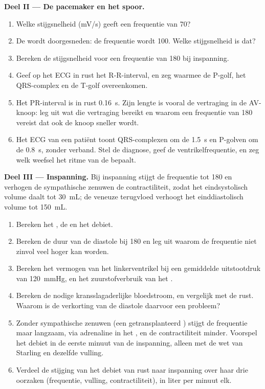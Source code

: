 \begin{problem}
\medskip
\noindent\textbf{Deel II --- De pacemaker en het spoor.}
\begin{enumerate}[resume]
  \item Welke stijgsnelheid (\unit{mV/s}) geeft een frequentie van 70?
  \item De  wordt doorgesneden: de frequentie wordt 100. Welke
        stijgsnelheid is dat?
  \item Bereken de stijgsnelheid voor een frequentie van 180 bij
        inspanning.
  \item Geef op het ECG in rust het R-R-interval, en zeg waarmee de P-golf,
        het QRS-complex en de T-golf overeenkomen.
  \item Het PR-interval is in rust \qty{0.16}{s}. Zijn lengte is vooral de
        vertraging in de AV-knoop: leg uit wat die vertraging bereikt en
        waarom een frequentie van 180 vereist dat ook de knoop sneller wordt.
  \item Het ECG van een patiënt toont QRS-complexen om de \qty{1.5}{s} en
        P-golven om de \qty{0.8}{s}, zonder verband. Stel de diagnose, geef
        de ventrikelfrequentie, en zeg welk weefsel het ritme van de
         bepaalt.
\end{enumerate}

\medskip
\noindent\textbf{Deel III --- Inspanning.}
Bij inspanning stijgt de frequentie tot 180 en verhogen de sympathische
zenuwen de contractiliteit, zodat het eindsystolisch volume daalt tot
\qty{30}{mL}; de veneuze terugvloed verhoogt het einddiastolisch volume tot
\qty{150}{mL}.
\begin{enumerate}[resume]
  \item Bereken het , de  en het debiet.
  \item Bereken de duur van de diastole bij 180 en leg uit waarom de
        frequentie niet zinvol veel hoger kan worden.
  \item Bereken het vermogen van het linkerventrikel bij een gemiddelde
        uitstootdruk van \qty{120}{mmHg}, en het zuurstofverbruik van het
        .
  \item Bereken de nodige kransslagaderlijke bloedstroom, en vergelijk met
        de rust. Waarom is de verkorting van de diastole daarvoor een
        probleem?
  \item Zonder sympathische zenuwen (een getransplanteerd ) stijgt de
        frequentie maar langzaam, via adrenaline in het , en de
        contractiliteit minder. Voorspel het debiet in de eerste minuut van
        de inspanning, alleen met de wet van Starling en dezelfde vulling.
  \item Verdeel de stijging van het debiet van rust naar inspanning over
        haar drie oorzaken (frequentie, vulling, contractiliteit), in liter
        per minuut elk.
\end{enumerate}


\end{problem}
